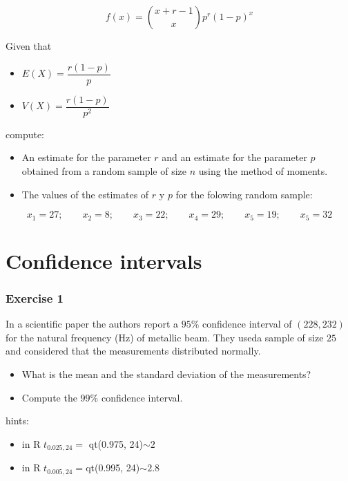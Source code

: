 \documentclass[
]{book}
\providecommand{\tightlist}{%
  \setlength{\itemsep}{0pt}\setlength{\parskip}{0pt}}
\begin{document}
\[f(x) = \binom{x+r-1}{x}p^r(1-p)^x\]

Given that

\begin{itemize}
\tightlist
\item
  \(E(X)=\dfrac{r(1-p)}{p}\)
\item
  \(V(X) =\dfrac{r(1-p)}{p^2}\)
\end{itemize}

compute:

\begin{itemize}
\item
  An estimate for the parameter \(r\) and an estimate for the parameter \(p\) obtained from a random sample of size \(n\) using the method of moments.
\item
  The values of the estimates of \(r\) y \(p\) for the folowing random sample:
\end{itemize}

\[x_1 = 27; \qquad x_2 = 8; \qquad  x_3 = 22; \qquad  x_4 = 29; \qquad  x_5 = 19; \qquad  x_5 = 32\]

\hypertarget{confidence-intervals}{%
\section{Confidence intervals}\label{confidence-intervals}}

\hypertarget{exercise-1-9}{%
\subsubsection{Exercise 1}\label{exercise-1-9}}

In a scientific paper the authors report a \(95\%\) confidence interval of \((228, 232)\) for the natural frequency (Hz) of metallic beam. They useda sample of size \(25\) and considered that the measurements distributed normally.

\begin{itemize}
\item
  What is the mean and the standard deviation of the measurements?
\item
  Compute the \(99\%\) confidence interval.
\end{itemize}

hints:

\begin{itemize}
\item
  in R \(t_{0.025, 24}=\) qt(0.975, 24)\(\sim 2\)
\item
  in R \(t_{0.005, 24}=\)qt(0.995, 24)\(\sim 2.8\)
\end{itemize}
\end{document}
